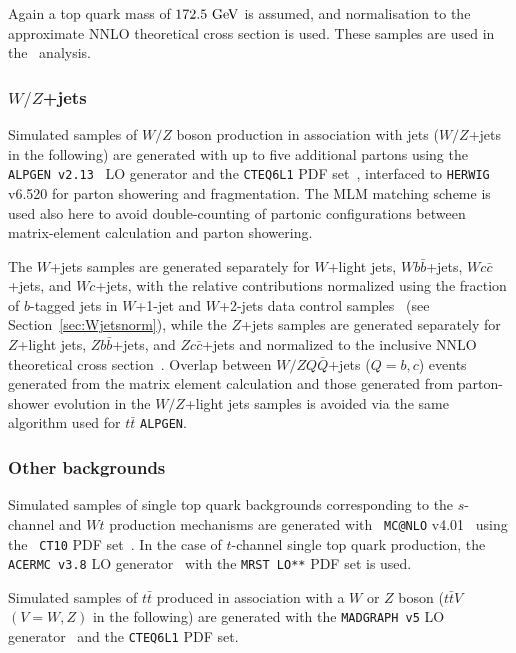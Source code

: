 
Again a top quark mass of $172.5\gev$ is assumed, and normalisation to the
approximate NNLO theoretical cross section is used.
These samples are used in the \htx\ analysis.


\subsubsection{$W/Z$+jets}

Simulated samples of $W/Z$ boson production in association with jets
($W/Z$+jets in the following) are generated with up to five additional 
partons using the {\tt ALPGEN v2.13}~\cite{ALPGEN} LO generator and the 
{\tt CTEQ6L1} PDF set~\cite{cteq6}, interfaced to {\tt HERWIG} v6.520 
for parton showering and fragmentation.
The MLM matching scheme is used also here to avoid double-counting of partonic configurations 
between  matrix-element  calculation and parton showering.

The $W$+jets samples are generated separately for $W$+light jets, 
$Wb\bar{b}$+jets, $Wc\bar{c}$+jets, and $Wc$+jets, 
with the relative contributions normalized using the fraction 
of $b$-tagged jets in $W$+1-jet and $W$+2-jets data 
control samples~\cite{whf} (see Section~\ref{sec:Wjetsnorm}), while
the $Z$+jets samples are generated separately 
for $Z$+light jets, $Zb\bar{b}$+jets, and $Zc\bar{c}$+jets and
normalized to the inclusive NNLO theoretical cross section~\cite{vjetsxs}.
Overlap between $W/ZQ\bar{Q}$+jets ($Q=b,c$) 
events generated from the matrix element calculation and those
generated from parton-shower evolution in the $W/Z$+light jets
samples is avoided via the same algorithm used
for $t\bar{t}$ \texttt{ALPGEN}.

\subsubsection{Other backgrounds}\label{subsec:otherbkg}
Simulated samples of single top quark backgrounds corresponding to the
$s$-channel and $Wt$ production mechanisms are generated with {\tt
MC@NLO} v4.01~\cite{mcatnlo_1,mcatnlo_2,mcatnlo_3} using the {\tt
CT10} PDF set~\cite{ct10}.  In the case of $t$-channel single top
quark production, the {\tt ACERMC v3.8} LO generator~\cite{acermc}
with the {\tt MRST LO**} PDF set is used.

Simulated samples of $t\bar{t}$ produced in association with a $W$ or $Z$ boson
($t\bar{t}V$ $(V=W,Z)$ in the following) are generated with the {\tt MADGRAPH v5} LO
generator~\cite{madgraph} and the {\tt CTEQ6L1} PDF set.  

